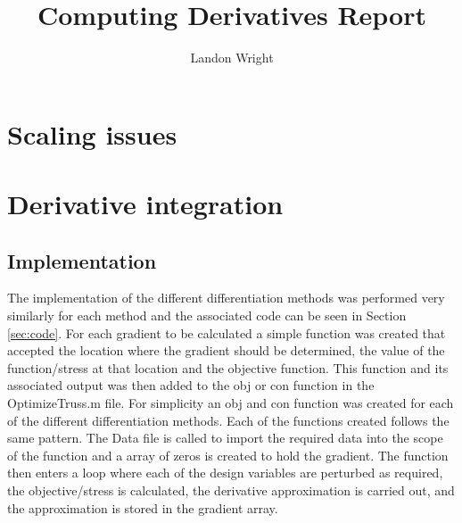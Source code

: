 \documentclass{article}
\begin{document}
\singlespacing
\title{Computing Derivatives Report}
\author{Landon Wright}
\maketitle

\section{Scaling issues}

\section{Derivative integration}
\subsection{Implementation}
The implementation of the different differentiation methods was performed very similarly for each method and the associated code can be seen in Section \ref{sec:code}. For each gradient to be calculated a simple function was created that accepted the location where the gradient should be determined, the value of the function/stress at that location and the objective function.  This function and its associated output was then added to the obj or con function in the OptimizeTruss.m file.  For simplicity an obj and con function was created for each of the different differentiation methods.  Each of the functions created follows the same pattern. The Data file is called to import the required data into the scope of the function and a array of zeros is created to hold the gradient.  The function then enters a loop where each of the design variables are perturbed as required, the objective/stress is calculated, the derivative approximation is carried out, and the approximation is stored in the gradient array.
\end{document}
